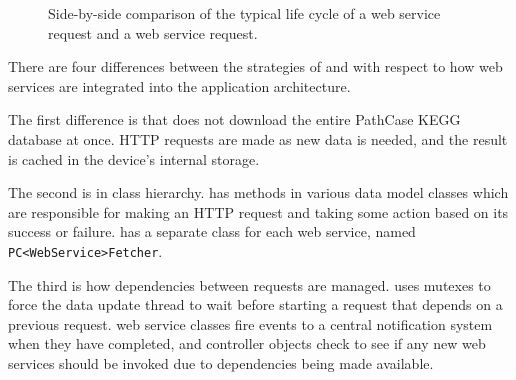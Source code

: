 \begin{figure}[hbt]
    \caption{\label{fig:kegg_impl_web_service_differences} Side-by-side
    comparison of the typical life cycle of a \keggapp web service request and
    a \mawapp web service request.}
\end{figure}

There are four differences between the strategies of \mawapp and \keggapp
with respect to how web services are integrated into the application
architecture.

The first difference is that \keggapp does not download the entire PathCase
KEGG database at once. HTTP requests are made as new data is needed, and the
result is cached in the device's internal storage.

The second is in class hierarchy. \mawapp has methods in various data model
classes which are responsible for making an HTTP request and taking some action
based on its success or failure. \keggapp has a separate class for each web
service, named \texttt{PC<WebService>Fetcher}.

The third is how dependencies between requests are managed. \mawapp uses
mutexes to force the data update thread to wait before starting a request that
depends on a previous request. \keggappp web service classes fire events to
a central notification system when they have completed, and controller objects
check to see if any new web services should be invoked due to dependencies being
made available.

